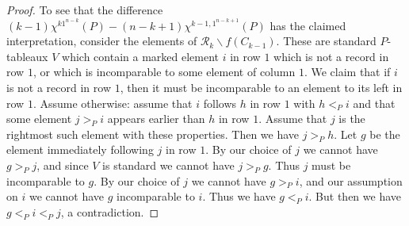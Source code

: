 \documentclass[10pt,a4paper]{amsart}
\newcommand{\ssm}{\smallsetminus}
\begin{document}
\begin{proof}
  To see that the difference
  $(k-1) \chi^{k1^{n-k}}(P) - (n-k+1) \chi^{k-1,1^{n-k+1}}(P)$
  has the claimed interpretation, consider the
  elements of $\mathcal R_k \ssm f(C_{k-1})$.
  These are standard $P$-tableaux $V$
  which contain a marked element $i$ in row $1$
  which is not a record in row $1$, or which is incomparable to
  some element of column $1$.  We claim that if $i$ is
  not a record in row $1$, then it must
  be incomparable to an element to its left in row $1$.
  Assume otherwise: assume that $i$ follows $h$ in row $1$ with $h <_P i$
  and that some element $j >_P i$ appears earlier than $h$ in row $1$.
  Assume that $j$ is the rightmost such element with these properties.
  Then we have $j >_P h$.
  Let $g$ be the element immediately following $j$ in row $1$.
  By our choice of $j$ we cannot have $g >_P j$,
  and since $V$ is standard we cannot have $j >_P g$.
  Thus $j$ must be incomparable to $g$.
  By our choice of $j$ we cannot have $g >_P i$,
  and our assumption on $i$ we cannot have $g$ incomparable to $i$.
  Thus we have $g <_P i$.  But then we have $g <_P i <_P j$, a contradiction.
\end{proof}
\end{document}
